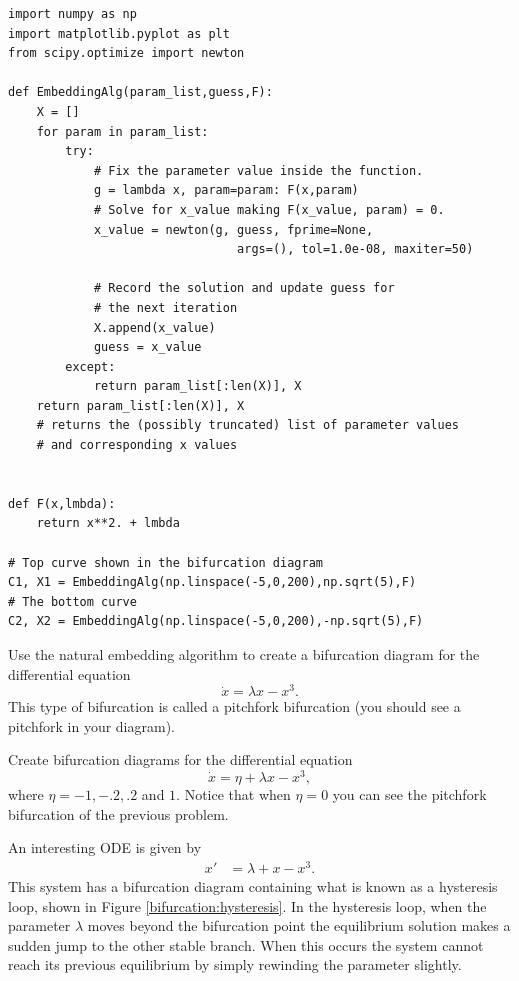 \begin{lstlisting}
import numpy as np
import matplotlib.pyplot as plt
from scipy.optimize import newton

def EmbeddingAlg(param_list,guess,F):
	X = []
	for param in param_list:
		try:
			# Fix the parameter value inside the function.
			g = lambda x, param=param: F(x,param)
			# Solve for x_value making F(x_value, param) = 0.
			x_value = newton(g, guess, fprime=None, 
								args=(), tol=1.0e-08, maxiter=50)
			
			# Record the solution and update guess for 
			# the next iteration
			X.append(x_value)
			guess = x_value 
		except:
			return param_list[:len(X)], X	
	return param_list[:len(X)], X   		
	# returns the (possibly truncated) list of parameter values 
	# and corresponding x values


def F(x,lmbda):
	return x**2. + lmbda

# Top curve shown in the bifurcation diagram
C1, X1 = EmbeddingAlg(np.linspace(-5,0,200),np.sqrt(5),F)
# The bottom curve
C2, X2 = EmbeddingAlg(np.linspace(-5,0,200),-np.sqrt(5),F)
\end{lstlisting}


\begin{problem}
Use the natural embedding algorithm to create a bifurcation diagram for the differential equation
\[\dot{x} = \lambda x-x^3.\]
This type of bifurcation is called a pitchfork bifurcation (you should see a pitchfork in your diagram).
\end{problem}

\begin{problem}
Create bifurcation diagrams for the differential equation
\[\dot{x} = \eta + \lambda x-x^3,\]
where $\eta = -1, -.2, .2$ and $1.$  Notice that when $\eta = 0$ you can see the pitchfork bifurcation of the previous problem.
\end{problem}

An interesting ODE is given by 
\begin{align*}
	x' &= \lambda + x - x^3.
\end{align*}
This system has a bifurcation diagram containing what is known as a hysteresis loop, shown in Figure \ref{bifurcation:hysteresis}.  In the hysteresis loop, when the parameter $\lambda$ moves beyond the bifurcation point the equilibrium solution makes a sudden jump to the other stable branch.  When this occurs the system cannot reach its previous equilibrium by simply rewinding the parameter slightly. 


